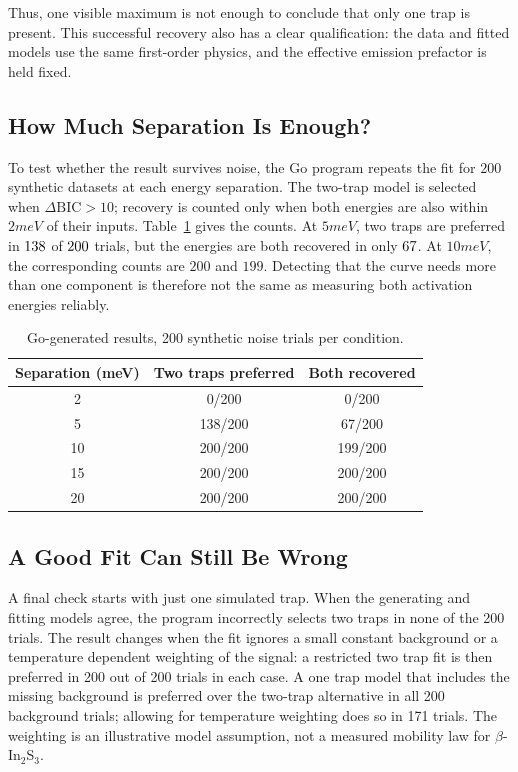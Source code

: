 \documentclass[letterpaper, 10pt, conference]{ieeeconf}
\begin{document}
Thus, one visible maximum is not enough to conclude that only one trap is present. This successful recovery also has a clear qualification: the data and fitted models use the same first-order physics, and the effective emission prefactor is held fixed.

\subsection{How Much Separation Is Enough?}
To test whether the result survives noise, the Go program repeats the fit for $200$ synthetic datasets at each energy separation. The two-trap model is selected when $\Delta\mathrm{BIC}>10$; recovery is counted only when both energies are also within $2 meV$ of their inputs. Table~\ref{tab:resolution} gives the counts. At $5 meV$, two traps are preferred in $138$ of $200$ trials, but the energies are both recovered in only $67$. At $10 meV$, the corresponding counts are $200$ and $199$. Detecting that the curve needs more than one component is therefore not the same as measuring both activation energies reliably.

\begin{table}[H]
\caption{Go-generated results, 200 synthetic noise trials per condition.}
\label{tab:resolution}
\centering\footnotesize
\begin{tabular}{@{}ccc@{}}\toprule
Separation (meV) & Two traps preferred & Both recovered\\\midrule
2 & 0/200 & 0/200\\
5 & 138/200 & 67/200\\
10 & 200/200 & 199/200\\
15 & 200/200 & 200/200\\
20 & 200/200 & 200/200\\\bottomrule
\end{tabular}
\end{table}

\subsection{A Good Fit Can Still Be Wrong}
A final check starts with just one simulated trap. When the generating and fitting models agree, the program incorrectly selects two traps in none of the 200 trials. The result changes when the fit ignores a small constant background or a temperature dependent weighting of the signal: a restricted two trap fit is then preferred in 200 out of 200 trials in each case. A one trap model that includes the missing background is preferred over the two-trap alternative in all 200 background trials; allowing for temperature weighting does so in 171 trials. The weighting is an illustrative model assumption, not a measured mobility law for $\beta$-In$_2$S$_3$.
\end{document}
